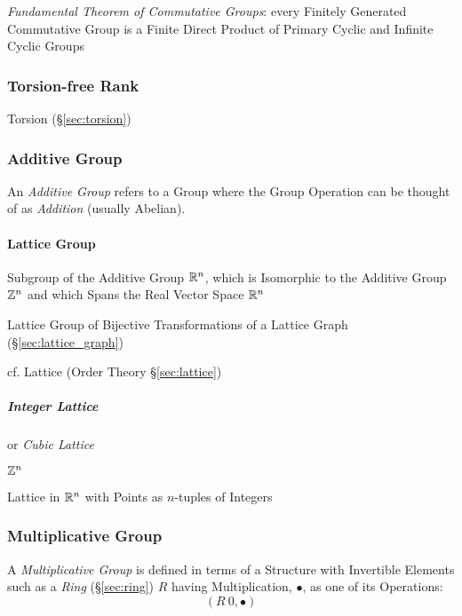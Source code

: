 \emph{Fundamental Theorem of Commutative Groups}: every Finitely Generated
Commutative Group is a Finite Direct Product of Primary Cyclic and Infinite
Cyclic Groups



\subsubsection{Torsion-free Rank}\label{sec:torsionfree_rank}

Torsion (\S\ref{sec:torsion})



\subsubsection{Additive Group}\label{sec:additive_group}

An \emph{Additive Group} refers to a Group where the Group Operation
can be thought of as \emph{Addition} (usually Abelian).



\paragraph{Lattice Group}\label{sec:lattice_group}\hfill

Subgroup of the Additive Group $\mathbb{R}^n$, which is Isomorphic to the Additive
Group $\mathbb{Z}^n$ and which Spans the Real Vector Space $\mathbb{R}^n$

\fist Lattice Group of Bijective Transformations of a Lattice Graph
(\S\ref{sec:lattice_graph})

cf. Lattice (Order Theory \S\ref{sec:lattice})



\subparagraph{Integer Lattice}\label{sec:integer_lattice}\hfill

or \emph{Cubic Lattice}

$\mathbb{Z}^n$

Lattice in $\mathbb{R}^n$ with Points as $n$-tuples of Integers



\subsubsection{Multiplicative Group}\label{sec:multiplicative_group}

A \emph{Multiplicative Group} is defined in terms of a Structure with
Invertible Elements such as a \emph{Ring} (\S\ref{sec:ring}) $R$
having Multiplication, $\bullet$, as one of its Operations:
\[
  (R \ {0}, \bullet)
\]


